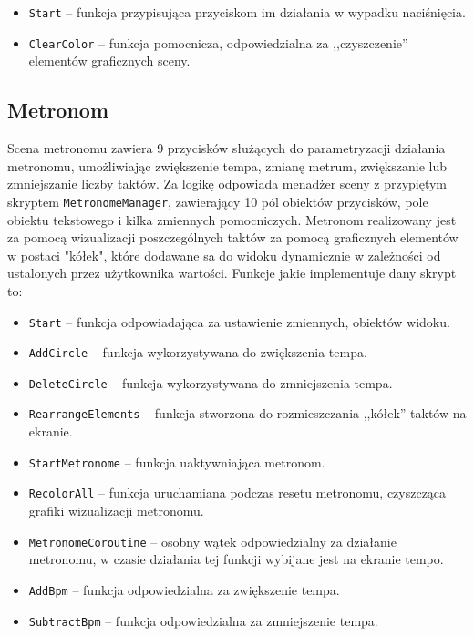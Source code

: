 \begin{itemize}
    \item \texttt{Start} -- funkcja przypisująca przyciskom im działania w wypadku naciśnięcia.
    \item \texttt{ClearColor} -- funkcja pomocnicza, odpowiedzialna za ,,czyszczenie'' elementów graficznych sceny.
\end{itemize}

\subsection{Metronom}

Scena metronomu zawiera 9 przycisków służących do parametryzacji działania metronomu, umożliwiając zwiększenie tempa, zmianę metrum, zwiększanie lub zmniejszanie liczby taktów. Za logikę odpowiada menadżer sceny z przypiętym skryptem \texttt{MetronomeManager}, zawierający 10 pól obiektów przycisków, pole obiektu tekstowego i kilka zmiennych pomocniczych. Metronom realizowany jest za pomocą wizualizacji poszczególnych taktów za pomocą graficznych elementów w postaci "kółek", które dodawane sa do widoku dynamicznie w zależności od ustalonych przez użytkownika wartości. Funkcje jakie implementuje dany skrypt to:

\begin{itemize}
    \item \texttt{Start} -- funkcja odpowiadająca za ustawienie zmiennych, obiektów widoku. 
    \item \texttt{AddCircle} -- funkcja wykorzystywana do zwiększenia tempa.
    \item \texttt{DeleteCircle} -- funkcja wykorzystywana do zmniejszenia tempa.
    \item \texttt{RearrangeElements} -- funkcja stworzona do rozmieszczania ,,kółek'' taktów na ekranie.
    \item \texttt{StartMetronome} -- funkcja uaktywniająca metronom.
    \item \texttt{RecolorAll} -- funkcja uruchamiana podczas resetu metronomu, czyszcząca grafiki wizualizacji metronomu.
    \item \texttt{MetronomeCoroutine} -- osobny wątek odpowiedzialny za działanie metronomu, w czasie działania tej funkcji wybijane jest na ekranie tempo.
    \item \texttt{AddBpm} -- funkcja odpowiedzialna za zwiększenie tempa.
    \item \texttt{SubtractBpm} -- funkcja odpowiedzialna za zmniejszenie tempa.
\end{itemize}

